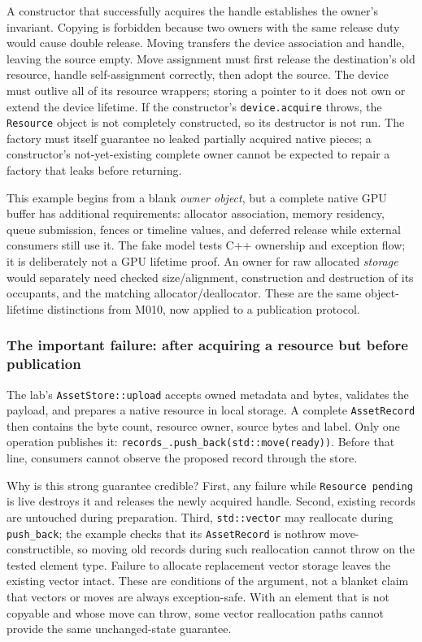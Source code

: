 A constructor that successfully acquires the handle establishes the owner's invariant. Copying is forbidden because two owners with the same release duty would cause double release. Moving transfers the device association and handle, leaving the source empty. Move assignment must first release the destination's old resource, handle self-assignment correctly, then adopt the source. The device must outlive all of its resource wrappers; storing a pointer to it does not own or extend the device lifetime. If the constructor's \texttt{device.acquire} throws, the \texttt{Resource} object is not completely constructed, so its destructor is not run. The factory must itself guarantee no leaked partially acquired native pieces; a constructor's not-yet-existing complete owner cannot be expected to repair a factory that leaks before returning.

This example begins from a blank \emph{owner object}, but a complete native GPU buffer has additional requirements: allocator association, memory residency, queue submission, fences or timeline values, and deferred release while external consumers still use it. The fake model tests C++ ownership and exception flow; it is deliberately not a GPU lifetime proof. An owner for raw allocated \emph{storage} would separately need checked size/alignment, construction and destruction of its occupants, and the matching allocator/deallocator. These are the same object-lifetime distinctions from M010, now applied to a publication protocol.

\subsubsection{The important failure: after acquiring a resource but before publication}\label{the-important-failure-after-acquiring-a-resource-but-before-publication}

The lab's \texttt{AssetStore::upload} accepts owned metadata and bytes, validates the payload, and prepares a native resource in local storage. A complete \texttt{AssetRecord} then contains the byte count, resource owner, source bytes and label. Only one operation publishes it: \texttt{records\_.push\_back(std::move(ready))}. Before that line, consumers cannot observe the proposed record through the store.

Why is this strong guarantee credible? First, any failure while \texttt{Resource\ pending} is live destroys it and releases the newly acquired handle. Second, existing records are untouched during preparation. Third, \texttt{std::vector} may reallocate during \texttt{push\_back}; the example checks that its \texttt{AssetRecord} is nothrow move-constructible, so moving old records during such reallocation cannot throw on the tested element type. Failure to allocate replacement vector storage leaves the existing vector intact. These are conditions of the argument, not a blanket claim that vectors or moves are always exception-safe. With an element that is not copyable and whose move can throw, some vector reallocation paths cannot provide the same unchanged-state guarantee.

